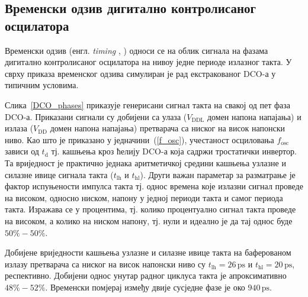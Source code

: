 \documentclass[master]{finthesis}
\makeatletter
\newcommand*{\engl}[2][\@empty]{%
    \edef\theacronym{#1}%
    (енгл. \foreignlanguage{english}{\emph{#2}%
    \ifx\theacronym\@empty \else , #1\fi})%
}
\def \DCO  {DCO} %
\makeatother
\begin{document}
\subsection{Временски одзив дигитално контролисаног осцилатора}
Временски одзив \engl{timing} односи се на облик сигнала на фазама дигитално контролисаног осцилатора на нивоу једне периоде излазног такта. У сврху приказа временског одзива симулиран је рад екстракованог \DCO-а у типичним условима. \par

Слика~\ref{DCO_phases} приказује генерисани сигнал такта на свакој од пет фаза \DCO-а. Приказани сигнали су добијени са улаза ($V_\text{DDL}$ домен напона напајања) и излаза ($V_\text{DD}$ домен напона напајања) претварача са ниског на висок напонски ниво. Као што је приказано у једначини~(\ref{f_osc}), учестаност осциловања $f_\text{osc}$ зависи од $t_\text{d}$ тј. кашњења кроз ћелију \DCO-а која садржи тростатички инвертор. Та вриједност је практично једнака аритметичкој средини кашњења узлазне и силазне ивице сигнала такта ($t_\text{lh}$ и $t_\text{hl}$). Други важан параметар за разматрање је фактор испуњености импулса такта тј. однос времена које излазни сигнал проведе на високом, односно ниском, напону у једној периоди такта и самог периода такта. Изражава се у процентима, тј. колико процентуално сигнал такта проведе на високом, а колико на ниском напону, тј. нули и идеално је да тај однос буде $50\%-50\%$. \par
Добијене вриједности кашњења узлазне и силазне ивице такта на баферованом излазу претварача са ниског на висок напонски ниво су $t_\text{lh}=26\,\text{ps}$ и $t_\text{hl}=20\,\text{ps}$, респективно. Добијени однос унутар радног циклуса такта је апроксимативно $48\%-52\%$. Временски помјерај између двије сусједне фазе је око $940\,\text{ps}$.
\end{document}
